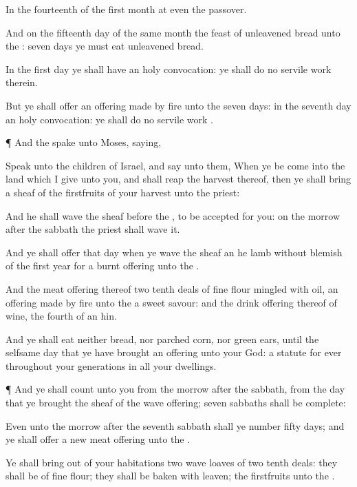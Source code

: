 {In the
fourteenth
{} of the
first
month at
even
{} the
{}
passover.

And on the
fifteenth
day of the same
month
{} the
feast of unleavened
bread unto the
{}:
seven
days ye must
eat unleavened
bread.

In the
first
day ye shall have an
holy
convocation: ye shall
do no
servile
work therein.

But ye shall
offer an offering made by
fire unto the
{}
seven
days: in the
seventh
day
{} an
holy
convocation: ye shall
do no
servile
work
{}.


\par }{\PP {}¶ And the
{}
spake unto
Moses,
saying,

Speak unto the
children of
Israel, and
say unto them, When ye be
come into the
land which I
give unto you, and shall
reap the
harvest thereof, then ye shall
bring a
sheaf of the
firstfruits of your
harvest unto the
priest:

And he shall
wave the
sheaf
before the
{}, to be
accepted for you: on the
morrow after the
sabbath the
priest shall
wave it.

And ye shall
offer that
day when ye
wave the
sheaf an he
lamb without
blemish of the
first
year for a burnt
offering unto the
{}.

And the meat
offering thereof
{}
two tenth
deals of fine
flour
mingled with
oil, an offering made by
fire unto the
{}
{} a
sweet
savour: and the drink
offering thereof
{} of
wine, the
fourth
{} of an
hin.

And ye shall
eat neither
bread, nor parched
corn, nor green
ears, until the
selfsame
day
that ye have
brought an
offering unto your
God:
{} a
statute for
ever throughout your
generations in all your
dwellings.


\par }{\PP {}¶ And ye shall
count unto you from the
morrow after the
sabbath, from the
day that ye
brought the
sheaf of the wave
offering;
seven
sabbaths shall
be
complete:

Even
unto the
morrow after the
seventh
sabbath shall ye
number
fifty
days; and ye shall
offer a
new meat
offering unto the
{}.

Ye shall bring
out of your
habitations
two
wave
loaves of
two tenth
deals: they shall be of fine
flour; they shall be
baken with
leaven;
{} the
firstfruits unto the
{}.

}
